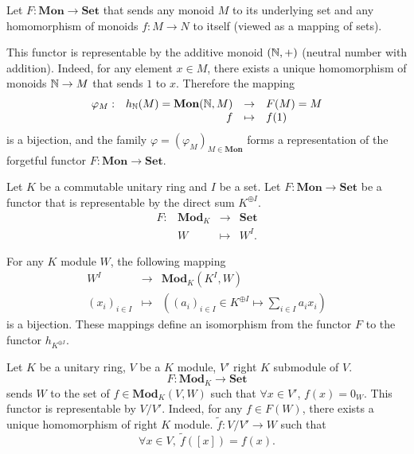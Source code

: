 \begin{exampleenv}
    Let $F:\mathbf{Mon}\rightarrow\mathbf{Set}$ that sends any monoid $M$ to its underlying set and any homomorphism of monoids $f:M\rightarrow N$ to itself (viewed as a mapping of sets).

    \quad This functor is representable by the additive monoid $(\mathbb{N},+)$ (neutral number with addition). Indeed, for any element $x\in M$, there exists a unique homomorphism of monoids $\mathbb{N}\rightarrow M$ that sends $1$ to $x$. Therefore the mapping
    $$ \begin{array}{rrcl}
        \varphi_{M} :& h_{\mathbb{N}}(M) = \mathbf{Mon}(\mathbb{N},M) &\rightarrow & F(M) = M\\
        & f & \mapsto &f(1)
    \end{array}
    $$
    is a bijection, and the family $\varphi = \left(\varphi_M\right)_{M\in \mathbf{Mon}}$ forms a representation of the forgetful functor $F:\mathbf{Mon} \rightarrow\mathbf{Set}$.
\end{exampleenv}
\begin{exampleenv}
    Let $K$ be a commutable unitary ring and $I$ be a set. Let $F:\mathbf{Mon}\rightarrow\mathbf{Set}$ be a functor that is representable by the direct sum $K^{\oplus I}$.
    $$ \begin{array}{rrcl}
        F: & \mathbf{Mod}_K & \rightarrow & \mathbf{Set}\\
        & W & \mapsto & W^I.
    \end{array}
    $$

    \quad For any $K$ module $W$, the following mapping
    $$ \begin{array}{rcl}
        W^I & \rightarrow & \mathbf{Mod}_{K}\left(K^I, W\right)\\
        \left(x_i\right)_{i\in I} & \mapsto & \left(\left(a_i\right)_{i\in I} \in K^{\oplus I} \mapsto \sum_{i\in I} a_i x_i\right)
    \end{array}
    $$
    is a bijection. These mappings define an isomorphism from the functor $F$ to the functor $h_{K^{\oplus I}}$.
\end{exampleenv}
\begin{exampleenv}
    Let $K$ be a unitary ring, $V$ be a $K$ module, $V'$ right $K$ submodule of $V$.
    $$ F:\mathbf{Mod}_{K} \rightarrow \mathbf{Set}$$
    sends $W$ to the set of $f\in \mathbf{Mod}_K(V,W)$ such that $\forall x\in V'$, $f(x) = 0_W$.
    This functor is representable by $V/V'$. Indeed, for any $f\in F(W)$, there exists a unique homomorphism of right $K$ module.
    $\tilde{f}:V/V'\rightarrow W$ such that 
    $$ \forall x\in V,\ \tilde{f}\left([x]\right) =f(x).$$
\end{exampleenv}